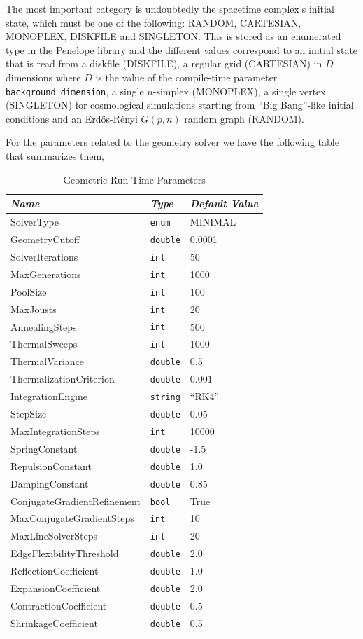\documentclass[12pt,letterpaper]{report}
\begin{document}
The most important category is undoubtedly the spacetime complex's initial state, 
which must be one of the following: RANDOM, CARTESIAN, MONOPLEX, DISKFILE and 
SINGLETON. This is stored as an enumerated type in the Penelope library and the 
different values correspond to an initial state that is read from a diskfile (DISKFILE), 
a regular grid (CARTESIAN) in $D$ dimensions where $D$ is the value of the compile-time 
parameter \texttt{background\_dimension}, a single $n$-simplex (MONOPLEX), a single vertex 
(SINGLETON) for cosmological simulations starting from ``Big Bang''-like initial conditions 
and an Erd\H{o}s-R\'enyi $G(p,n)$ random graph (RANDOM). 

For the parameters related to the geometry solver we have the following table that 
summarizes them,
\begin{table}[htbp]
\centering
\begin{tabular}{|l|l|l|}
\hline
\emph{Name} & \emph{Type} & \emph{Default Value} \\ 
\hline \hline
SolverType & \texttt{enum} & MINIMAL \\
GeometryCutoff & \texttt{double} & 0.0001 \\
SolverIterations & \texttt{int} & 50 \\
MaxGenerations & \texttt{int} & 1000 \\
PoolSize & \texttt{int} & 100 \\ 
MaxJousts & \texttt{int} & 20 \\ 
AnnealingSteps & \texttt{int} & 500 \\ 
ThermalSweeps & \texttt{int} & 1000 \\
ThermalVariance & \texttt{double} & 0.5 \\
ThermalizationCriterion & \texttt{double} & 0.001 \\
IntegrationEngine & \texttt{string} & ``RK4'' \\
StepSize & \texttt{double} & 0.05 \\
MaxIntegrationSteps & \texttt{int} & 10000 \\
SpringConstant & \texttt{double} & -1.5 \\
RepulsionConstant & \texttt{double} & 1.0 \\
DampingConstant & \texttt{double} & 0.85 \\
ConjugateGradientRefinement & \texttt{bool} & True \\
MaxConjugateGradientSteps & \texttt{int} & 10 \\
MaxLineSolverSteps & \texttt{int} & 20 \\
EdgeFlexibilityThreshold & \texttt{double} & 2.0 \\
ReflectionCoefficient & \texttt{double} & 1.0 \\
ExpansionCoefficient & \texttt{double} & 2.0 \\
ContractionCoefficient & \texttt{double} & 0.5 \\
ShrinkageCoefficient & \texttt{double} & 0.5 \\
\hline
\end{tabular}
\caption{Geometric Run-Time Parameters}
\label{rt_parms2}
\end{table}
\end{document}
